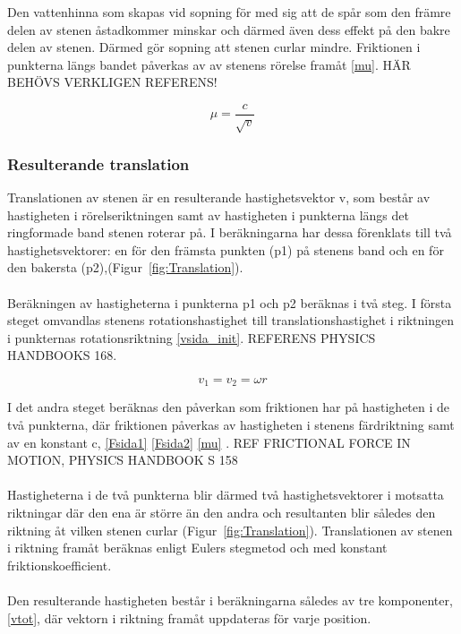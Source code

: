 \documentclass[11pt]{article} %
\begin{document}
Den vattenhinna som skapas vid sopning för med sig att de spår som den främre delen av stenen åstadkommer minskar och därmed  även dess effekt på den bakre delen av stenen. Därmed gör sopning att stenen curlar mindre. Friktionen i punkterna längs bandet påverkas av av stenens rörelse framåt \eqref{mu}. HÄR BEHÖVS VERKLIGEN REFERENS!     

\begin{equation}\label{mu} 
\mu=\frac{c}{\sqrt{v}}
\end{equation}

\subsubsection{Resulterande translation}

Translationen av stenen är en resulterande hastighetsvektor v, som består av hastigheten i rörelseriktningen samt av hastigheten i punkterna längs det ringformade band stenen roterar på. I beräkningarna har dessa förenklats till två hastighetsvektorer: en för den främsta punkten (p1)  på stenens band och en för den bakersta (p2),(Figur~\ref{fig:Translation}). 
\\\\Beräkningen av hastigheterna i punkterna p1 och p2 beräknas i två steg. I första steget omvandlas stenens rotationshastighet till translationshastighet i riktningen i punkternas rotationsriktning \eqref{vsida_init}. REFERENS PHYSICS HANDBOOKS 168.
 
\begin{equation}\label{vsida_init}
 v_1 = v_2 = \omega r
 \end{equation}

I det andra steget beräknas den påverkan som friktionen har på hastigheten i de två punkterna, där friktionen påverkas av hastigheten i stenens färdriktning samt av en konstant c,  \eqref{Fsida1} \eqref{Fsida2} \eqref{mu} . 
REF FRICTIONAL FORCE IN MOTION, PHYSICS HANDBOOK S 158
\\\\Hastigheterna i de två punkterna blir därmed två hastighetsvektorer i motsatta riktningar där den ena är större än den andra och resultanten blir således den riktning åt vilken stenen curlar (Figur~\ref{fig:Translation}). 
Translationen av stenen i riktning framåt beräknas enligt Eulers stegmetod och med konstant friktionskoefficient. 
\\\\Den resulterande hastigheten består i beräkningarna således av tre komponenter, \eqref{vtot}, där vektorn i riktning framåt uppdateras för varje position. 
\end{document}
